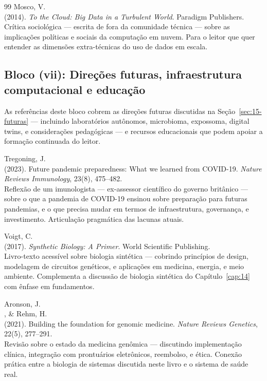\begin{thebibliography}{99}
 Mosco, V.\\ (2014). \emph{To the Cloud: Big Data in a Turbulent World}. Paradigm Publishers.\\ Crítica sociológica --- escrita de fora da comunidade técnica --- sobre as implicações políticas e sociais da computação em nuvem. Para o leitor que quer entender as dimensões extra-técnicas do uso de dados em escala.



\subsection*{Bloco (vii): Direções futuras, infraestrutura computacional e educação}

As referências deste bloco cobrem as direções futuras discutidas na Seção~\ref{sec:15-futuras} --- incluindo laboratórios autônomos, microbioma, expossoma, digital twins, e considerações pedagógicas --- e recursos educacionais que podem apoiar a formação continuada do leitor.

 Tregoning, J.\\ (2023). Future pandemic preparedness: What we learned from COVID-19. \emph{Nature Reviews Immunology}, 23(8), 475--482.\\ Reflexão de um imunologista --- ex-assessor científico do governo britânico --- sobre o que a pandemia de COVID-19 ensinou sobre preparação para futuras pandemias, e o que precisa mudar em termos de infraestrutura, governança, e investimento. Articulação pragmática das lacunas atuais.

 Voigt, C.\\ (2017). \emph{Synthetic Biology: A Primer}. World Scientific Publishing.\\ Livro-texto acessível sobre biologia sintética --- cobrindo princípios de design, modelagem de circuitos genéticos, e aplicações em medicina, energia, e meio ambiente. Complementa a discussão de biologia sintética do Capítulo~\ref{cap:14} com ênfase em fundamentos.

 Aronson, J.\\, \& Rehm, H.\\ (2021). Building the foundation for genomic medicine. \emph{Nature Reviews Genetics}, 22(5), 277--291.\\ Revisão sobre o estado da medicina genômica --- discutindo implementação clínica, integração com prontuários eletrônicos, reembolso, e ética. Conexão prática entre a biologia de sistemas discutida neste livro e o sistema de saúde real.


\end{thebibliography}
